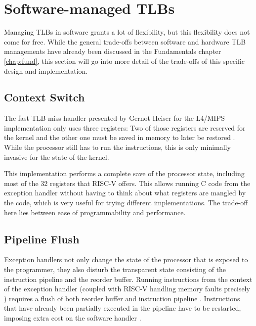 \section{Software-managed TLBs}
Managing TLBs in software grants a lot of flexibility, but this flexibility does not come
for free. While the general trade-offs between software and hardware TLB managements have
already been discussed in the Fundamentals chapter \ref{chap:fund}, this section will
go into more detail of the trade-offs of this specific design and implementation.

\subsection{Context Switch} The fast TLB miss handler presented by Gernot Heiser for the
L4/MIPS implementation only uses three registers: Two of those registers are reserved
for the kernel and the other one must be saved in memory to later be restored \cite{heiserAnatomyHighPerformanceMicrokernel}.
While the processor still has to run the instructions, this is only minimally invasive
for the state of the kernel.

This implementation performs a complete save of the processor state, including most of the
32 registers that RISC-V offers.
This allows running C code from the exception handler without having to think about what
registers are mangled by the code, which is very useful for trying different implementations.
The trade-off here lies between ease of programmability and performance.

\subsection{Pipeline Flush} Exception handlers not only change the state of the processor that is
exposed to the programmer, they also disturb the transparent state consisting of the
instruction pipeline and the reorder buffer.
Running instructions from the context of the exception handler (coupled with RISC-V handling
memory faults precisely \cite{RISCVInstructionSet}) requires a flush of both reorder buffer
and instruction pipeline \cite{jacobVirtualMemoryContemporary1998}.
Instructions that have already been partially executed in the pipeline have to be restarted,
imposing extra cost on the software handler \cite{jacob1998look}.

